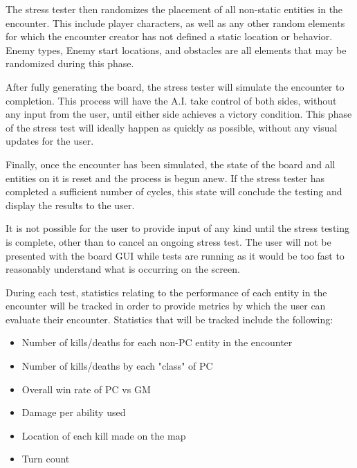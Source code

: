 \documentclass[12pt,a4paper]{report}
\begin{document}
		The stress tester then randomizes the placement of all non-static entities in the encounter. This include player characters, as well as any other random elements for which the encounter creator has not defined a static location or behavior. Enemy types, Enemy start locations, and obstacles are all elements that may be randomized during this phase. 
		
		After fully generating the board, the stress tester will simulate the encounter to completion. This process will have the A.I. take control of both sides, without any input from the user, until either side achieves a victory condition. This phase of the stress test will ideally happen as quickly as possible, without any visual updates for the user. 
		
		Finally, once the encounter has been simulated, the state of the board and all entities on it is reset and the process is begun anew. If the stress tester has completed a sufficient number of cycles, this state will conclude the testing and display the results to the user. 
		
		It is not possible for the user to provide input of any kind until the stress testing is complete, other than to cancel an ongoing stress test. The user will not be presented with the board GUI while tests are running as it would be too fast to reasonably understand what is occurring on the screen. 
		
		During each test, statistics relating to the performance of each entity in the encounter will be tracked in order to provide metrics by which the user can evaluate their encounter. Statistics that will be tracked include the following:
		 
		\begin{itemize}
			\item Number of kills/deaths for each non-PC entity in the encounter
			\item Number of kills/deaths by each "class" of PC
			\item Overall win rate of PC vs GM
			\item Damage per ability used
			\item Location of each kill made on the map
			\item Turn count
		\end{itemize}
	
\end{document}
